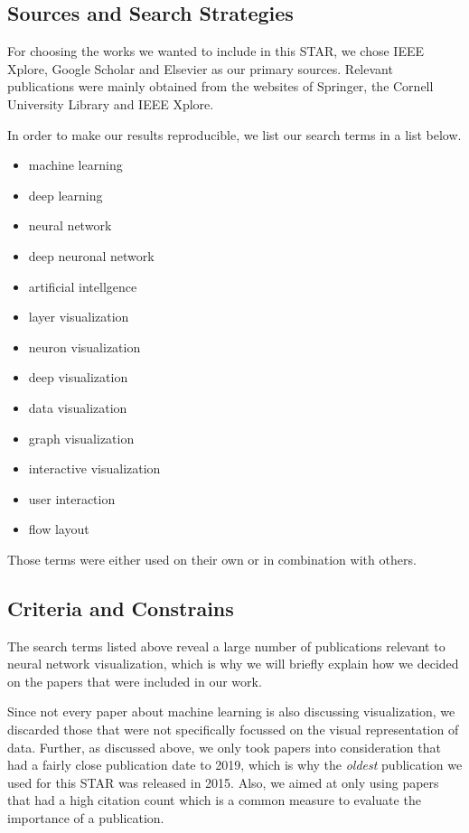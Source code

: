 \documentclass{acmsiggraph}               %
\begin{document}
\subsection{Sources and Search Strategies}
For choosing the works we wanted to include in this STAR, we chose IEEE Xplore, Google Scholar and Elsevier as our primary sources. Relevant publications were mainly obtained from the websites of Springer, the Cornell University Library and IEEE Xplore.

In order to make our results reproducible, we list our search terms in a list below.

\begin{multicols}{2}
\begin{itemize}
\item machine learning
\item deep learning
\item neural network
\item deep neuronal network
\item artificial intellgence
\item layer visualization
\item neuron visualization
\item deep visualization
\item data visualization
\item graph visualization
\item interactive visualization
\item user interaction
\item flow layout
\end{itemize}
\end{multicols}

Those terms were either used on their own or in combination with others.

\subsection{Criteria and Constrains}
The search terms listed above reveal a large number of publications relevant to neural network visualization, which is why we will briefly explain how we decided on the papers that were included in our work.

Since not every paper about machine learning is also discussing visualization, we discarded those that were not specifically focussed on the visual representation of data. Further, as discussed above, we only took papers into consideration that had a fairly close publication date to 2019, which is why the \textit{oldest} publication we used for this STAR was released in 2015. Also, we aimed at only using papers that had a high citation count which is a common measure to evaluate the importance of a publication.
\end{document}
